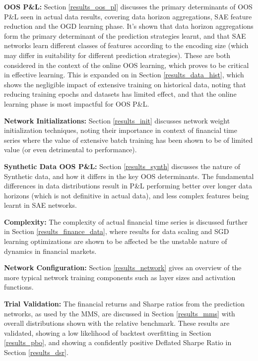 \documentclass[a4paper,11pt,oneside]{article}
\theoremstyle{plain}
\theoremstyle{definition}
\begin{document}
	\textbf{OOS P\&L:} Section \ref{results_oos_pl} discusses the primary determinants of OOS P\&L seen in actual data results, covering data horizon aggregations, SAE feature reduction and the OGD learning phase. It's shown that data horizon aggregations form the primary determinant of the prediction strategies learnt, and that SAE networks learn different classes of features according to the encoding size (which may differ in suitability for different prediction strategies). These are both considered in the context of the online OOS learning, which proves to be critical in effective learning. This is expanded on in Section \ref{results_data_hist}, which shows the negligible impact of extensive training on historical data, noting that reducing training epochs and datasets has limited effect, and that the online learning phase is most impactful for OOS P\&L. \newline
	
	\textbf{Network Initializations:} Section \ref{results_init} discusses network weight initialization techniques, noting their importance in context of financial time series where the value of extensive batch training has been shown to be of limited value (or even detrimental to performance).\newline
	
	\textbf{Synthetic Data OOS P\&L:} Section \ref{results_synth} discusses the nature of Synthetic data, and how it differs in the key OOS determinants. The fundamental differences in data distributions result in P\&L performing better over longer data horizons (which is not definitive in actual data), and less complex features being learnt in SAE networks.\newline
	
	\textbf{Complexity:} The complexity of actual financial time series is discussed further in Section \ref{results_finance_data}, where results for data scaling and SGD learning optimizations are shown to be affected be the unstable nature of dynamics in financial markets.\newline
	
	\textbf{Network Configuration:} Section \ref{results_network} gives an overview of the more typical network training components such as layer sizes and activation functions.\newline
	
	\textbf{Trial Validation:} The financial returns and Sharpe ratios from the prediction networks, as used by the MMS, are discussed in Section \ref{results_mms} with overall distributions shown with the relative benchmark. These results are validated, showing a low likelihood of backtest overfitting in Section \ref{results_pbo}, and showing a confidently positive Deflated Sharpe Ratio in Section \ref{results_dsr}.  \newline
	
\end{document}
